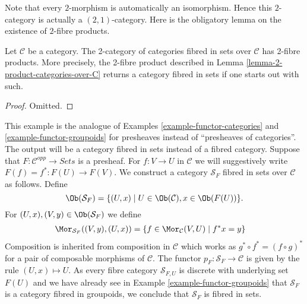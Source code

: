 \noindent
Note that every $2$-morphism is automatically an isomorphism.
Hence this $2$-category is actually a $(2, 1)$-category.
Here is the obligatory lemma on the existence of $2$-fibre products.

\begin{lemma}
\label{lemma-2-product-categories-fibred-sets}
Let $\mathcal{C}$ be a category.
The 2-category of categories fibred in sets over $\mathcal{C}$
has 2-fibre products. More precisely, the 2-fibre product described in
Lemma \ref{lemma-2-product-categories-over-C}
returns a category fibred in sets if one starts out with such.
\end{lemma}

\begin{proof}
Omitted.
\end{proof}

\begin{example}
\label{example-presheaf}
This example is the analogue of
Examples \ref{example-functor-categories} and
\ref{example-functor-groupoids}
for presheaves instead of ``presheaves of categories''.
The output will be a category fibred in sets instead of a fibred category.
Suppose that $F : \mathcal{C}^{opp} \to \textit{Sets}$ is a presheaf.
For $f : V \to U$ in $\mathcal{C}$ we will
suggestively write $F(f) = f^\ast : F(U) \to F(V)$.
We construct a category $\mathcal{S}_F$ fibred in sets over $\mathcal{C}$
as follows. Define
$$
\Ob(\mathcal{S}_F) =
\{(U, x) \mid U \in \Ob(\mathcal{C}), x \in \Ob(F(U))\}.
$$
For $(U, x), (V, y) \in \Ob(\mathcal{S}_F)$ we define
\begin{align*}
\Mor_{\mathcal{S}_F}((V, y), (U, x))
& =
\{f \in \Mor_\mathcal{C}(V, U) \mid f^*x = y\}
\end{align*}
Composition is inherited from composition in $\mathcal{C}$
which works as $g^\ast \circ f^\ast = (f \circ g)^\ast$
for a pair of composable morphisms of $\mathcal{C}$.
The functor $p_F : \mathcal{S}_F \to \mathcal{C}$
is given by the rule $(U, x) \mapsto U$.
As every fibre category $\mathcal{S}_{F, U}$ is discrete with underlying
set $F(U)$ and we have already see in
Example \ref{example-functor-groupoids}
that $\mathcal{S}_F$ is a category fibred in groupoids,
we conclude that $\mathcal{S}_F$ is fibred in sets.
\end{example}

